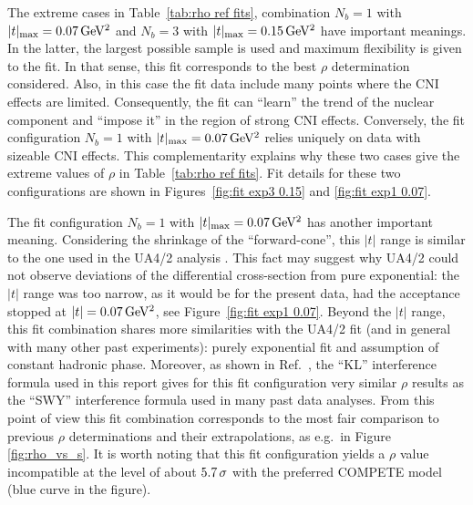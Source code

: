 The extreme cases in Table~\ref{tab:rho ref fits}, combination $N_b=1$ with $|t|_{\rm max} = 0.07\,{\rm GeV^2}$ and $N_b=3$ with $|t|_{\rm max} = 0.15\,{\rm GeV^2}$ have important meanings. In the latter, the largest possible sample is used and maximum flexibility is given to the fit. In that sense, this fit corresponds to the best $\rho$ determination considered. Also, in this case the fit data include many points where the CNI effects are limited. Consequently, the fit can ``learn'' the trend of the nuclear component and ``impose it'' in the region of strong CNI effects. Conversely, the fit configuration $N_b=1$ with $|t|_{\rm max} = 0.07\,{\rm GeV^2}$ relies uniquely on data with sizeable CNI effects. This complementarity explains why these two cases give the extreme values of $\rho$ in Table~\ref{tab:rho ref fits}. Fit details for these two configurations are shown in Figures~\ref{fig:fit exp3 0.15} and \ref{fig:fit exp1 0.07}.

The fit configuration $N_b=1$ with $|t|_{\rm max} = 0.07\,{\rm GeV^2}$ has another important meaning. Considering the shrinkage of the ``forward-cone'', this $|t|$ range is similar to the one used in the UA4/2 analysis \cite{ua4-rho}. This fact may suggest why UA4/2 could not observe deviations of the differential cross-section from pure exponential: the $|t|$ range was too narrow, as it would be for the present data, had the acceptance stopped at $|t| = 0.07\,{\rm GeV^2}$, see Figure~\ref{fig:fit exp1 0.07}. Beyond the $|t|$ range, this fit combination shares more similarities with the UA4/2 fit (and in general with many other past experiments): purely exponential fit and assumption of constant hadronic phase. Moreover, as shown in Ref.~\cite{totem-8tev-1km}, the ``KL'' interference formula \cite{kl94} used in this report gives for this fit configuration very similar $\rho$ results as the ``SWY'' interference formula \cite{wy68} used in many past data analyses. From this point of view this fit combination corresponds to the most fair comparison to previous $\rho$ determinations and their extrapolations, as e.g.~in Figure \ref{fig:rho_vs_s}. It is worth noting that this fit configuration yields a $\rho$ value incompatible at the level of about $5.7\,{\rm \sigma}$
with the preferred COMPETE model (blue curve in the figure).

